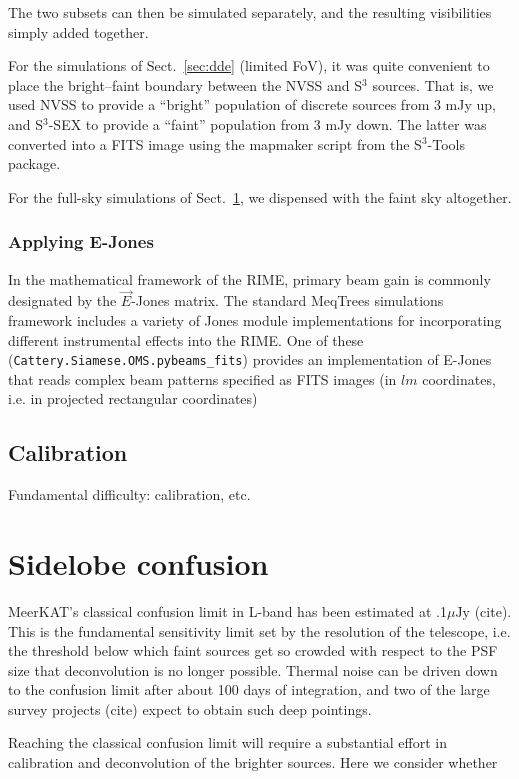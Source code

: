\documentclass{aa}
\begin{document}
The two subsets can then be simulated separately, and the resulting visibilities simply added together.

For the simulations of Sect.~\ref{sec:dde} (limited FoV), it was quite convenient to place the bright--faint boundary between the NVSS and S$^3$ sources. That is, we used NVSS to provide a ``bright'' population of discrete sources from 3 mJy up, and S$^3$-SEX to provide a ``faint'' population from 3 mJy down. The latter was converted into a FITS image using the mapmaker script from the S$^3$-Tools package. 

For the full-sky simulations of Sect.~\ref{sec:fsn}, we dispensed with the faint sky altogether.

\subsubsection{Applying E-Jones}

In the mathematical framework of the RIME, primary beam gain is commonly designated by the $\vec{E}$-Jones matrix. 
The standard MeqTrees simulations framework includes a variety of Jones module implementations for incorporating different instrumental effects into the RIME. One of these ({\tt Cattery.Siamese.OMS.pybeams\_fits}) provides an implementation of 
E-Jones that reads complex beam patterns specified as FITS images (in $lm$ coordinates, i.e. in projected rectangular coordinates)


\subsection{Calibration}

Fundamental difficulty: calibration, etc.

\section{Sidelobe confusion}
\label{sec:fsn}

MeerKAT's classical confusion limit in L-band has been estimated at .1$\mu\mbox{Jy}$ (cite). This is the fundamental sensitivity limit set by the resolution of the telescope, i.e. the threshold below which faint sources get so crowded with respect to the PSF size that deconvolution is no longer possible. Thermal noise can be driven down to the confusion limit after about 100 days of integration, and two of the large survey projects (cite) expect to obtain such deep pointings. 

Reaching the classical confusion limit will require a substantial effort in calibration and deconvolution of the brighter sources. Here we consider whether
\end{document}
